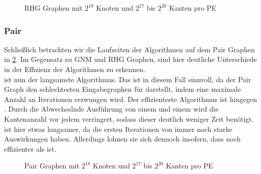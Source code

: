 \newpage


\begin{figure}[H]
    \centering
    
    
    
    
    \caption{RHG Graphen mit $2^{18}$ Knoten und $2^{17}$ bis $2^{20}$ Kanten pro PE}
    \label{RHG-graphs-Img}
\end{figure}





\subsubsection{Pair}
Schließlich betrachten wir die Laufzeiten der Algorithmen auf dem Pair Graphen in \cref{Pair-graphs-Img}. Im Gegensatz zu GNM und RHG Graphen, sind hier deutliche Unterschiede in der Effizienz der Algorithmen zu erkennen.\\
\boruvkaAllreduce ist nun der langsamste Algorithmus. Das ist in diesem Fall sinnvoll, da der Pair Graph den schlechtesten Eingabegraphen für \boruvkasAlgorithmus darstellt, indem eine maximale Anzahl an Iterationen erzwungen wird.
Der effizienteste Algorithmus ist hingegen \boruvkaMixedMergeNoSpace. Durch die Abwecheslnde Ausführung von einem \boruvkaStep und einem \mergeStep wird die Kantenanzahl vor jedem \boruvkaStep verringert, sodass dieser deutlich weniger Zeit benötigt.\\
\boruvkaThenMerge ist hier etwas langsamer, da die ersten Iterationen von \boruvkasAlgorithmus immer noch starke Auswirkungen haben. Allerdings lohnen sie sich dennoch insofern, dass \boruvkaThenMerge noch effizienter als \mergeMST ist.

\newpage

\begin{figure}[H]
    \centering
    
    
    
    
    \caption{Pair Graphen mit $2^{18}$ Knoten und $2^{17}$ bis $2^{20}$ Kanten pro PE}
    \label{Pair-graphs-Img}
\end{figure}


